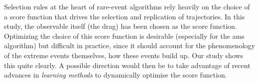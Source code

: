 {%
Selection rules at the heart of rare-event algorithms rely heavily on the choice of a score function that drives the selection and replication of trajectories. 
In this study, the observable itself (the drag) has been chosen as the score function.
Optimizing the choice of this score function is desirable (especially for the \ac{ams} algorithm) but difficult in practice, since it should account for the phenomenology of the extreme events themselves, how these events build up. Our study shows this quite clearly. A possible direction would then be to take advantage of recent advances in \emph{learning methods} to dynamically optimise the score function.}